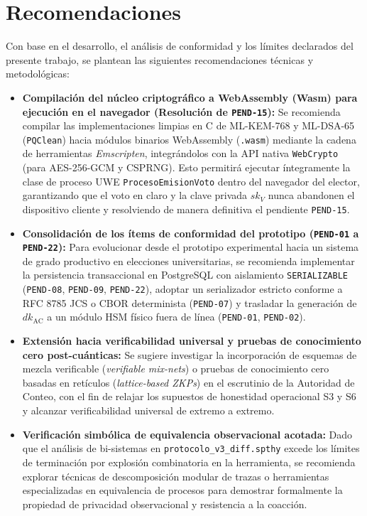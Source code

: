 \section{Recomendaciones}

Con base en el desarrollo, el análisis de conformidad y los límites declarados del presente trabajo, se plantean las siguientes recomendaciones técnicas y metodológicas:

\begin{itemize}
	\item \textbf{Compilación del núcleo criptográfico a WebAssembly (Wasm) para ejecución en el navegador (Resolución de \texttt{PEND-15}):} Se recomienda compilar las implementaciones limpias en C de ML-KEM-768 y ML-DSA-65 (\texttt{PQClean}) hacia módulos binarios WebAssembly (\texttt{.wasm}) mediante la cadena de herramientas \textit{Emscripten}, integrándolos con la API nativa \texttt{WebCrypto} (para AES-256-GCM y CSPRNG). Esto permitirá ejecutar íntegramente la clase de proceso UWE \texttt{ProcesoEmisionVoto} dentro del navegador del elector, garantizando que el voto en claro y la clave privada $sk_V$ nunca abandonen el dispositivo cliente y resolviendo de manera definitiva el pendiente \texttt{PEND-15}.
	\item \textbf{Consolidación de los ítems de conformidad del prototipo (\texttt{PEND-01} a \texttt{PEND-22}):} Para evolucionar desde el prototipo experimental hacia un sistema de grado productivo en elecciones universitarias, se recomienda implementar la persistencia transaccional en PostgreSQL con aislamiento \texttt{SERIALIZABLE} (\texttt{PEND-08}, \texttt{PEND-09}, \texttt{PEND-22}), adoptar un serializador estricto conforme a RFC 8785 JCS o CBOR determinista (\texttt{PEND-07}) y trasladar la generación de $dk_{\text{AC}}$ a un módulo HSM físico fuera de línea (\texttt{PEND-01}, \texttt{PEND-02}).
	\item \textbf{Extensión hacia verificabilidad universal y pruebas de conocimiento cero post-cuánticas:} Se sugiere investigar la incorporación de esquemas de mezcla verificable (\textit{verifiable mix-nets}) o pruebas de conocimiento cero basadas en retículos (\textit{lattice-based ZKPs}) en el escrutinio de la Autoridad de Conteo, con el fin de relajar los supuestos de honestidad operacional S3 y S6 y alcanzar verificabilidad universal de extremo a extremo.
	\item \textbf{Verificación simbólica de equivalencia observacional acotada:} Dado que el análisis de bi-sistemas en \texttt{protocolo\_v3\_diff.spthy} excede los límites de terminación por explosión combinatoria en la herramienta, se recomienda explorar técnicas de descomposición modular de trazas o herramientas especializadas en equivalencia de procesos para demostrar formalmente la propiedad de privacidad observacional y resistencia a la coacción.
\end{itemize}
